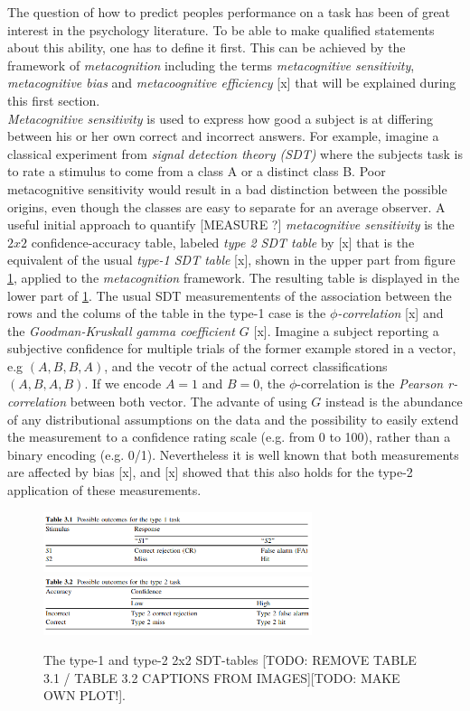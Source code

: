\documentclass[../main/main.tex]{subfiles}
\begin{document}
	The question of how to predict peoples performance on a task has been of great interest in the psychology literature. To be able to make qualified statements about this ability, one has to define it first.
	This can be achieved by the framework of \textit{metacognition} including the terms \textit{metacognitive sensitivity}, \textit{metacognitive bias} and \textit{metacoognitive efficiency} [x] that will be explained during this first section.\\
	\textit{Metacognitive sensitivity} is used to express how good a subject is at differing between his or her own correct and incorrect answers. For example, imagine a classical experiment from \textit{signal detection theory (SDT)} where the subjects task is to rate a stimulus to come from a class A or a distinct class B. Poor metacognitive sensitivity would result in a bad distinction between the possible origins, even though the classes are easy to separate for an average observer. A useful initial approach to quantify [MEASURE ?] \textit{metacognitive sensitivity} is the $2x2$ confidence-accuracy table, labeled \textit{type 2 SDT table} by [x] that is the equivalent of the usual \textit{type-1 SDT table} [x], shown in the upper part from figure \ref{fig:tables}, applied to the \textit{metacognition} framework. The resulting table is displayed in the lower part of \ref{fig:tables}. The usual SDT measurementents of the association between the rows and the colums of the table in the type-1 case is the \textit{$\phi$-correlation} [x] and the \textit{Goodman-Kruskall gamma coefficient $G$} [x]. Imagine a subject reporting a subjective confidence for multiple trials of the former example stored in a vector, e.g $(A, B, B, A)$, and the vecotr of the actual correct classifications $(A, B, A, B)$. If we encode $A=1$ and $B=0$, the $\phi$-correlation is the  \textit{Pearson r-correlation} between both vector. The advante of using $G$ instead is the abundance of any distributional assumptions on the data and the possibility to easily extend the measurement to a confidence rating scale (e.g. from 0 to 100), rather than a binary encoding (e.g. 0/1). Nevertheless it is well known that both measurements are affected by bias [x], and [x] showed that this also holds for the type-2 application of these measurements.
	\begin{figure}[h]
		\centering
		\captionsetup{justification=centering}
		\label{fig:tables}
		\includegraphics[width=0.7\textwidth]{../assets/type1_sdt_table.png}
		\includegraphics[width=0.7\textwidth]{../assets/type2_sdt_table.png}
		\caption{The type-1 and type-2 2x2 SDT-tables [TODO: REMOVE TABLE 3.1 / TABLE 3.2 CAPTIONS FROM IMAGES][TODO: MAKE OWN PLOT!].} 
	\end{figure}\\
\end{document}
